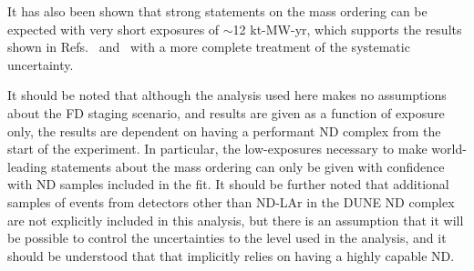 It has also been shown that strong statements on the mass ordering can be expected with very short exposures of $\sim$12 kt-MW-yr, which supports the results shown in Refs.~\cite{Abi:2020qib} and~\cite{Abi:2020evt} with a more complete treatment of the systematic uncertainty.

It should be noted that although the analysis used here makes no assumptions about the FD staging scenario, and results are given as a function of exposure only, the results are dependent on having a performant ND complex from the start of the experiment. In particular, the low-exposures necessary to make world-leading statements about the mass ordering can only be given with confidence with ND samples included in the fit. It should be further noted that additional samples of events from detectors other than ND-LAr in the DUNE ND complex are not explicitly included in this analysis, but there is an assumption that it will be possible to control the uncertainties to the level used in the analysis, and it should be understood that that implicitly relies on having a highly capable ND.
